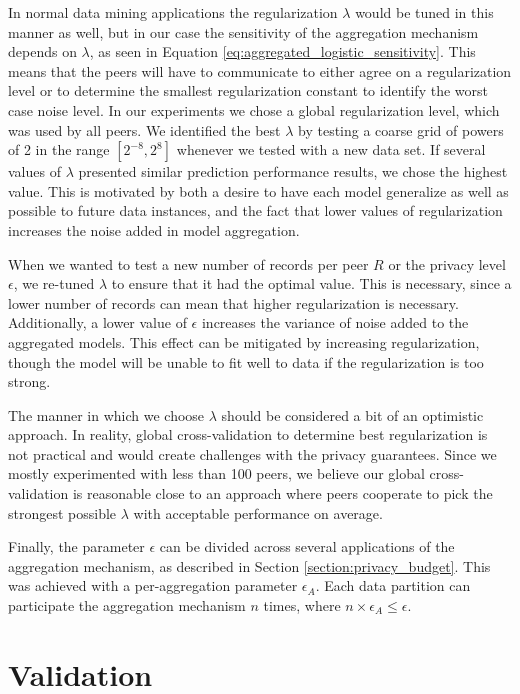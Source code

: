In normal data mining applications the regularization $\lambda$ would be tuned in this manner as well, but in our case the sensitivity of the aggregation mechanism depends on $\lambda$, as seen in Equation \ref{eq:aggregated_logistic_sensitivity}. This means that the peers will have to communicate to either agree on a regularization level or to determine the smallest regularization constant to identify the worst case noise level. In our experiments we chose a global regularization level, which was used by all peers. We identified the best $\lambda$ by testing a coarse grid of powers of 2 in the range $[2^{-8}, 2^{8}]$ whenever we tested with a new data set. If several values of $\lambda$ presented similar prediction performance results, we chose the highest value. This is motivated by both a desire to have each model generalize as well as possible to future data instances, and the fact that lower values of regularization increases the noise added in model aggregation.

When we wanted to test a new number of records per peer $R$ or the privacy level $\epsilon$, we re-tuned $\lambda$ to ensure that it had the optimal value. This is necessary, since a lower number of records can mean that higher regularization is necessary. Additionally, a lower value of $\epsilon$ increases the variance of noise added to the aggregated models. This effect can be mitigated by increasing regularization, though the model will be unable to fit well to data if the regularization is too strong.

The manner in which we choose $\lambda$ should be considered a bit of an optimistic approach. In reality, global cross-validation to determine best regularization is not practical and would create challenges with the privacy guarantees. Since we mostly experimented with less than 100 peers, we believe our global cross-validation is reasonable close to an approach where peers cooperate to pick the strongest possible $\lambda$ with acceptable performance on average.

Finally, the parameter $\epsilon$ can be divided across several applications of the aggregation mechanism, as described in Section \ref{section:privacy_budget}. This was achieved with a per-aggregation parameter $\epsilon_A$. Each data partition can participate the aggregation mechanism $n$ times, where $n \times \epsilon_A \leq \epsilon$.

\section{Validation}

